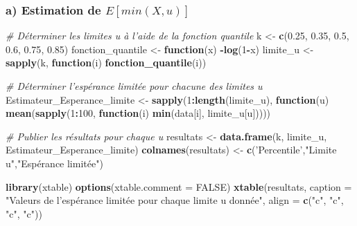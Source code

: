\documentclass[]{article}
\newenvironment{Shaded}{\begin{snugshade}}{\end{snugshade}}
\newcommand{\KeywordTok}[1]{\textcolor[rgb]{0.13,0.29,0.53}{\textbf{#1}}}
\newcommand{\DataTypeTok}[1]{\textcolor[rgb]{0.13,0.29,0.53}{#1}}
\newcommand{\DecValTok}[1]{\textcolor[rgb]{0.00,0.00,0.81}{#1}}
\newcommand{\FloatTok}[1]{\textcolor[rgb]{0.00,0.00,0.81}{#1}}
\newcommand{\StringTok}[1]{\textcolor[rgb]{0.31,0.60,0.02}{#1}}
\newcommand{\CommentTok}[1]{\textcolor[rgb]{0.56,0.35,0.01}{\textit{#1}}}
\newcommand{\OtherTok}[1]{\textcolor[rgb]{0.56,0.35,0.01}{#1}}
\newcommand{\ControlFlowTok}[1]{\textcolor[rgb]{0.13,0.29,0.53}{\textbf{#1}}}
\newcommand{\OperatorTok}[1]{\textcolor[rgb]{0.81,0.36,0.00}{\textbf{#1}}}
\newcommand{\NormalTok}[1]{#1}
\begin{document}
\subsubsection{\texorpdfstring{a) Estimation de
\(E[min(X,u)]\)}{a) Estimation de E{[}min(X,u){]}}}\label{a-estimation-de-eminxu}

\begin{Shaded}
\begin{Highlighting}[]
\CommentTok{# Déterminer les limites u à l'aide de la fonction quantile}
\NormalTok{k <-}\StringTok{ }\KeywordTok{c}\NormalTok{(}\FloatTok{0.25}\NormalTok{, }\FloatTok{0.35}\NormalTok{, }\FloatTok{0.5}\NormalTok{, }\FloatTok{0.6}\NormalTok{, }\FloatTok{0.75}\NormalTok{, }\FloatTok{0.85}\NormalTok{)}
\NormalTok{fonction_quantile <-}\StringTok{ }\ControlFlowTok{function}\NormalTok{(x) }\OperatorTok{-}\KeywordTok{log}\NormalTok{(}\DecValTok{1}\OperatorTok{-}\NormalTok{x)}
\NormalTok{limite_u <-}\StringTok{ }\KeywordTok{sapply}\NormalTok{(k, }\ControlFlowTok{function}\NormalTok{(i) }\KeywordTok{fonction_quantile}\NormalTok{(i))}

\CommentTok{# Déterminer l'espérance limitée pour chacune des limites u}
\NormalTok{Estimateur_Esperance_limite <-}\StringTok{ }\KeywordTok{sapply}\NormalTok{(}\DecValTok{1}\OperatorTok{:}\KeywordTok{length}\NormalTok{(limite_u), }\ControlFlowTok{function}\NormalTok{(u) }
                                    \KeywordTok{mean}\NormalTok{(}\KeywordTok{sapply}\NormalTok{(}\DecValTok{1}\OperatorTok{:}\DecValTok{100}\NormalTok{, }\ControlFlowTok{function}\NormalTok{(i) }
                                        \KeywordTok{min}\NormalTok{(data[i], limite_u[u]))))  }

\CommentTok{# Publier les résultats pour chaque u}
\NormalTok{resultats <-}\StringTok{ }\KeywordTok{data.frame}\NormalTok{(k, limite_u, Estimateur_Esperance_limite)}
\KeywordTok{colnames}\NormalTok{(resultats) <-}\StringTok{ }\KeywordTok{c}\NormalTok{(}\StringTok{'Percentile'}\NormalTok{,}\StringTok{"Limite u"}\NormalTok{,}\StringTok{"Espérance limitée"}\NormalTok{)}

\KeywordTok{library}\NormalTok{(xtable)}
\KeywordTok{options}\NormalTok{(}\DataTypeTok{xtable.comment =} \OtherTok{FALSE}\NormalTok{)}
\KeywordTok{xtable}\NormalTok{(resultats, }\DataTypeTok{caption =} \StringTok{"Valeurs de l'espérance limitée pour chaque limite u donnée"}\NormalTok{,  }
                 \DataTypeTok{align =} \KeywordTok{c}\NormalTok{(}\StringTok{"c"}\NormalTok{, }\StringTok{"c"}\NormalTok{, }\StringTok{"c"}\NormalTok{, }\StringTok{"c"}\NormalTok{)) }
\end{Highlighting}
\end{Shaded}
\end{document}

